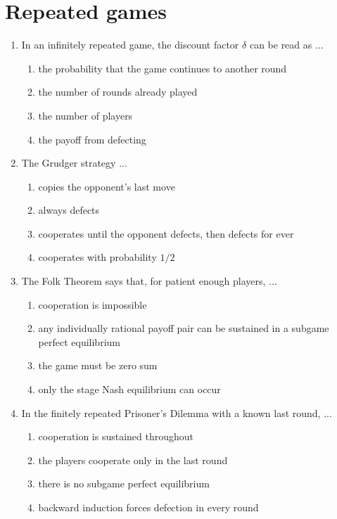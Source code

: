 \documentclass[11pt]{article}
\begin{document}
\section*{Repeated games}
\begin{enumerate}[itemsep=6pt]
  \item In an infinitely repeated game, the discount factor \(\delta\) can be read as ...
  \begin{enumerate}
    \item the probability that the game continues to another round
    \item the number of rounds already played
    \item the number of players
    \item the payoff from defecting
  \end{enumerate}
  \item The Grudger strategy ...
  \begin{enumerate}
    \item copies the opponent's last move
    \item always defects
    \item cooperates until the opponent defects, then defects for ever
    \item cooperates with probability \(1/2\)
  \end{enumerate}
  \item The Folk Theorem says that, for patient enough players, ...
  \begin{enumerate}
    \item cooperation is impossible
    \item any individually rational payoff pair can be sustained in a subgame perfect equilibrium
    \item the game must be zero sum
    \item only the stage Nash equilibrium can occur
  \end{enumerate}
  \item In the finitely repeated Prisoner's Dilemma with a known last round, ...
  \begin{enumerate}
    \item cooperation is sustained throughout
    \item the players cooperate only in the last round
    \item there is no subgame perfect equilibrium
    \item backward induction forces defection in every round
  \end{enumerate}

\end{enumerate}
\end{document}

